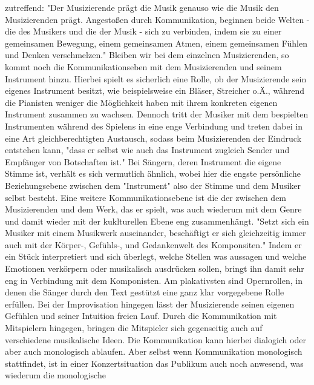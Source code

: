 zutreffend:
"Der Musizierende prägt die Musik genauso wie die Musik den Musizierenden prägt.
Angestoßen durch Kommunikation, beginnen beide Welten - die des Musikers und die
der Musik - sich zu verbinden, indem sie zu einer gemeinsamen Bewegung, einem
gemeinsamen Atmen, einem gemeinsamen Fühlen und Denken verschmelzen." \autocite[60]{doerne:umfassend_musizieren}
Bleiben wir bei dem einzelnen Musizierenden, so kommt noch die
Kommunikationseben mit dem Musizierenden und seinem Instrument hinzu. Hierbei
spielt es sicherlich eine Rolle, ob der Musizierende sein eigenes Instrument
besitzt, wie beispielsweise ein Bläser, Streicher o.Ä., während die Pianisten
weniger die Möglichkeit haben mit ihrem konkreten eigenen Instrument zusammen zu
wachsen. Dennoch tritt der Musiker mit dem bespielten Instrumenten während des
Spielens in eine enge Verbindung und treten dabei in eine Art gleichberechtigten
Austausch, sodass beim Musizierenden der Eindruck entstehen kann, "dass er selbst wie auch das Instrument zugleich Sender und
Empfänger von Botschaften ist." \autocite[59]{doerne:umfassend_musizieren}
Bei Sängern, deren Instrument die eigene Stimme ist, verhält es sich vermutlich
ähnlich, wobei hier die engste persönliche Beziehungsebene zwischen dem
"Instrument" also der Stimme und dem Musiker selbst besteht. 
Eine weitere Kommunikationsebene ist die der zwischen dem Musizierenden und dem
Werk, das er spielt, was auch wiederum mit dem Genre und damit wieder mit der
kuklturellen Ebene eng zusammenhängt.
"Setzt sich ein Musiker mit einem Musikwerk auseinander, beschäftigt er sich
gleichzeitig immer auch mit der Körper-, Gefühls-, und Gedankenwelt des
Komponsiten." \autocite[59]{doerne:umfassend_musizieren} Indem er ein Stück
interpretiert und sich überlegt, welche Stellen was aussagen und welche
Emotionen verkörpern oder musikalisch ausdrücken sollen, bringt ihn damit sehr
eng in Verbindung mit dem Komponisten. Am plakativsten sind Opernrollen, in denen die
Sänger durch den Text gestützt eine ganz klar vorgegebene Rolle erfüllen. Bei
der Improvisation hingegen lässt der Musizierende seinen eigenen Gefühlen und
seiner Intuition freien Lauf. Durch die Kommunikation mit Mitspielern hingegen,
bringen die Mitspieler sich gegenseitig auch auf verschiedene musikalische
Ideen. Die Kommunikation kann hierbei dialogich oder aber auch monologisch
ablaufen. \autocite[61]{doerne:umfassend_musizieren}
Aber selbst wenn Kommunikation monologisch stattfindet, ist in einer Konzertsituation das
Publikum auch noch anwesend, was wiederum die monologische 


